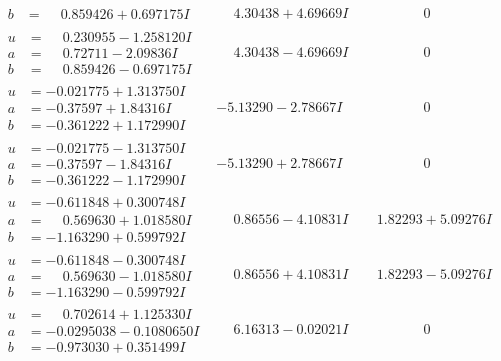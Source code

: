 \documentclass[1p]{elsarticle_modified}
\theoremstyle{definition}
\begin{document}
$$\begin{array}{c|c|c}
\begin{aligned}
b &= \phantom{-}0.859426 + 0.697175 I\end{aligned}
 & \phantom{-}4.30438 + 4.69669 I & \phantom{-0.000000 } 0 \\ \hline\begin{aligned}
u &= \phantom{-}0.230955 - 1.258120 I \\
a &= \phantom{-}0.72711 - 2.09836 I \\
b &= \phantom{-}0.859426 - 0.697175 I\end{aligned}
 & \phantom{-}4.30438 - 4.69669 I & \phantom{-0.000000 } 0 \\ \hline\begin{aligned}
u &= -0.021775 + 1.313750 I \\
a &= -0.37597 + 1.84316 I \\
b &= -0.361222 + 1.172990 I\end{aligned}
 & -5.13290 - 2.78667 I & \phantom{-0.000000 } 0 \\ \hline\begin{aligned}
u &= -0.021775 - 1.313750 I \\
a &= -0.37597 - 1.84316 I \\
b &= -0.361222 - 1.172990 I\end{aligned}
 & -5.13290 + 2.78667 I & \phantom{-0.000000 } 0 \\ \hline\begin{aligned}
u &= -0.611848 + 0.300748 I \\
a &= \phantom{-}0.569630 + 1.018580 I \\
b &= -1.163290 + 0.599792 I\end{aligned}
 & \phantom{-}0.86556 - 4.10831 I & \phantom{-}1.82293 + 5.09276 I \\ \hline\begin{aligned}
u &= -0.611848 - 0.300748 I \\
a &= \phantom{-}0.569630 - 1.018580 I \\
b &= -1.163290 - 0.599792 I\end{aligned}
 & \phantom{-}0.86556 + 4.10831 I & \phantom{-}1.82293 - 5.09276 I \\ \hline\begin{aligned}
u &= \phantom{-}0.702614 + 1.125330 I \\
a &= -0.0295038 - 0.1080650 I \\
b &= -0.973030 + 0.351499 I\end{aligned}
 & \phantom{-}6.16313 - 0.02021 I & \phantom{-0.000000 } 0 \\ \hline\begin{aligned}

\end{aligned}
\end{array}$$
\end{document}
